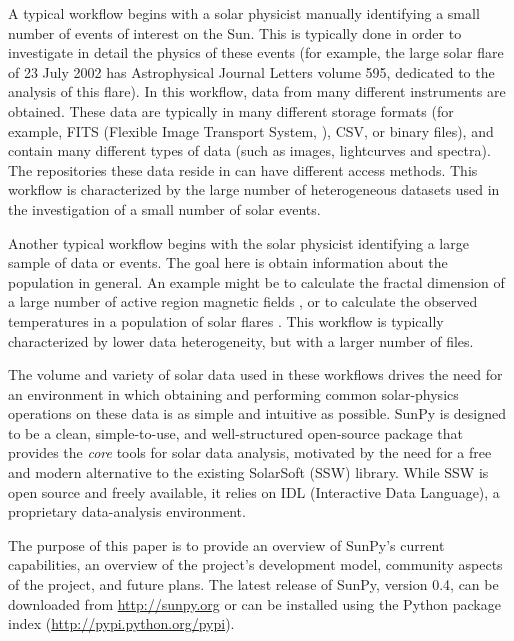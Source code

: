A typical workflow begins with a solar physicist manually identifying
a small number of events of interest on the Sun.  This is typically
done in order to investigate in detail the physics of these events
(for example, the large solar flare of 23 July 2002 has Astrophysical
Journal Letters volume 595, dedicated to the analysis of this flare).
In this workflow, data from many different instruments are obtained.
These data are typically in many different storage formats (for
example, FITS (Flexible Image Transport System, \cite{refId0}), CSV, or
binary files), and contain many different types of data (such as
images, lightcurves and spectra).  The repositories these data reside
in can have different access methods.  This workflow is characterized
by the large number of heterogeneous datasets used in the
investigation of a small number of solar events.

Another typical workflow begins with the solar physicist identifying a
large sample of data or events.  The goal here is obtain information
about the population in general.  An example might be to calculate the
fractal dimension of a large number of active region magnetic fields
\citep{2005ApJ...631..628M}, or to calculate the observed temperatures
in a population of solar flares \citep{2012ApJS..202...11R}.  This
workflow is typically characterized by lower data heterogeneity, but
with a larger number of files.

The volume and variety of solar data used in these workflows drives
the need for an environment in which obtaining and performing common
solar-physics operations on these data is as simple and intuitive as
possible.  SunPy is designed to be a clean, simple-to-use, and
well-structured open-source package that provides the \textit{core}
tools for solar data analysis, motivated by the need for a free and
modern alternative to the existing SolarSoft (SSW) library. While SSW
is open source and freely available, it relies on IDL (Interactive
Data Language), a proprietary data-analysis environment.

The purpose of this paper is to provide an overview of SunPy's current
capabilities, an overview of the project's development model, community aspects of the
project, and future plans. The latest release of SunPy, version 0.4,
can be downloaded from \url{http://sunpy.org} or can be
installed using the Python package index (\url{http://pypi.python.org/pypi}).
